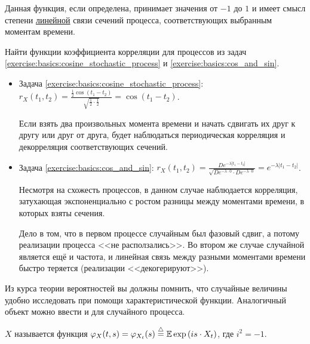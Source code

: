 Данная функция, если определена, принимает значения от $ -1 $ до $ 1 $
и имеет смысл степени \uline{линейной} связи сечений процесса,
соответствующих выбранным моментам времени.

\begin{Exercise}[counter=SecExercise, label={exercise:basics:correlation_coefficient_function}]
    \noindent
    Найти функции коэффициента корреляции для процессов из задач \ref{exercise:basics:cosine_stochastic_process} и \ref{exercise:basics:cos_and_sin}.
\end{Exercise}

\begin{Answer}
    \noindent
    \begin{itemize}
        \item
            Задача \ref{exercise:basics:cosine_stochastic_process}:
            $
                \displaystyle
                r_X(t_1, t_2) = \frac{\frac{1}{2} \cos(t_1 - t_2)}{\sqrt{\frac{1}{2} \cdot \frac{1}{2}}} = \cos(t_1 - t_2)
            $.

            Если взять два произвольных момента времени и начать сдвигать их друг к другу или друг от друга,
            будет наблюдаться периодическая корреляция и декорреляция соответствующих сечений.
        \item
            Задача \ref{exercise:basics:cos_and_sin}:
            $
                \displaystyle
                r_X(t_1, t_2) = \frac{D e^{-\lambda |t_1 - t_2|}}{\sqrt{D e^{-\lambda \cdot 0} \cdot D e^{-\lambda \cdot 0}}} = e^{-\lambda |t_1 - t_2|}
            $.

            Несмотря на схожесть процессов, в данном случае наблюдается корреляция,
            затухающая экспоненциально с ростом разницы между моментами времени,
            в которых взяты сечения.

            Дело в том, что в первом процессе случайным был фазовый сдвиг, а потому реализации процесса <<не расползались>>.
            Во втором же случае случайной является ещё и частота, и линейная связь между разными моментами времени быстро теряется
            (реализации <<декогерируют>>).
    \end{itemize}
\end{Answer}


Из курса теории вероятностей вы должны помнить,
что случайные величины удобно исследовать при помощи характеристической функции.
Аналогичный объект можно ввести и для случайного процесса.

\begin{definition}
    \label{definition:basics:characteristic_function}
     $ X $ называется функция $ \varphi_X(t, s) = \varphi_{X_t}(s) \overset{\triangle}{=} \operatorname{\mathbb{E}} \exp \left( i s \cdot X_t \right) $,
    где $ i^2 = -1 $.
\end{definition}
